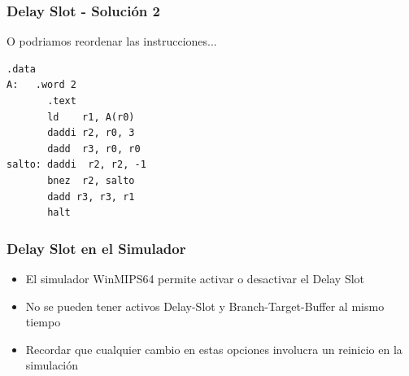 \documentclass{beamer}
\begin{document}
\begin{frame}[fragile]
\frametitle{Delay Slot - Solución 2 }
O podriamos reordenar las instrucciones...
\begin{block}{}
\begin{lstlisting}[language=WinMIPS64,basicstyle=\ttfamily,keywordstyle=\color{blue}]
       .data
A:   .word 2
       .text
       ld    r1, A(r0)
       daddi r2, r0, 3
       dadd  r3, r0, r0
salto: daddi  r2, r2, -1
       bnez  r2, salto
       dadd r3, r3, r1
       halt
\end{lstlisting}
\end{block}
\end{frame}


\begin{frame}
\frametitle{Delay Slot en el Simulador}
\begin{itemize}
\item El simulador WinMIPS64 permite activar o desactivar el Delay Slot
\item No se pueden tener activos Delay-Slot y Branch-Target-Buffer al mismo tiempo
\item Recordar que cualquier cambio en estas opciones involucra un reinicio en la simulación
\end{itemize}
\end{frame}
\end{document}

